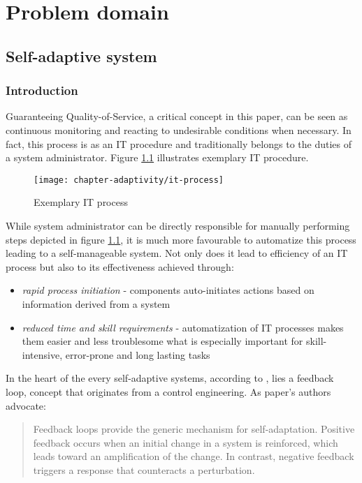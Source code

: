 \chapter{Problem domain}

\section{Self-adaptive system}

\subsection{Introduction}
Guaranteeing Quality-of-Service, a critical concept in this paper, can be seen as continuous monitoring and reacting to undesirable conditions when necessary. In fact, this process is as an IT procedure and traditionally belongs to the duties of a system administrator. Figure \ref{fig:it-process} illustrates exemplary IT procedure.

\begin{figure}[!ht]
  \begin{center}
    \texttt{[image: chapter-adaptivity/it-process]}
  \end{center}
  \caption{Exemplary IT process}
  \label{fig:it-process}
\end{figure}

While system administrator can be directly responsible for manually performing steps depicted in figure \ref{fig:it-process}, it is much more favourable to automatize this process leading to a self-manageable system. Not only does it lead to efficiency of an IT process but also to its effectiveness \cite{IBM06} achieved through:
\begin{itemize}
  \item \emph{rapid process initiation} - components auto-initiates actions based on information derived from a system
  \item \emph{reduced time and skill requirements} - automatization of IT processes makes them easier and less troublesome what is especially important for skill-intensive, error-prone and long lasting tasks
\end{itemize}

In the heart of the every self-adaptive systems, according to \cite{brun2009engineering}, lies a feedback loop, concept that originates from a control engineering. As paper's authors advocate:
\begin{quote}
Feedback loops provide the generic mechanism for self-adaptation. Positive feedback occurs when an initial change in a system is reinforced, which leads toward an amplification of the change. In contrast, negative feedback triggers a response that counteracts a perturbation. 
\end{quote}

